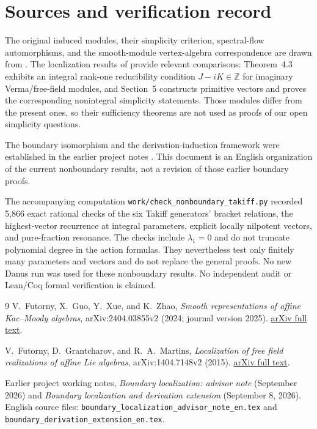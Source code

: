 \documentclass[11pt,a4paper]{article}
\newcommand{\Z}{\mathbb Z}
\theoremstyle{plainupright}
\begin{document}
\clearpage
\section{Sources and verification record}

The original induced modules, their simplicity criterion, spectral-flow
automorphisms, and the smooth-module vertex-algebra correspondence are
drawn from \cite{FGXZ}. The localization results of \cite{FGM} provide
relevant comparisons: Theorem~4.3 exhibits an integral rank-one
reducibility condition \(J-iK\in\Z\) for imaginary Verma/free-field
modules, and Section~5 constructs primitive vectors and proves
the corresponding nonintegral simplicity statements.
Those modules differ from the present ones, so their sufficiency
theorems are not used as proofs of our open simplicity questions.

The boundary isomorphism and the derivation-induction framework were
established in the earlier project notes \cite{Boundary}.
This document is an English organization of the current nonboundary
results, not a revision of those earlier boundary proofs.

The accompanying computation
\texttt{work/check\_nonboundary\_takiff.py} recorded 5,866 exact
rational checks of the six Takiff generators' bracket relations,
the highest-vector recurrence at integral parameters, explicit
locally nilpotent vectors, and pure-fraction resonance.
The checks include \(\lambda_1=0\) and do not truncate polynomial
degree in the action formulas. They nevertheless test only finitely
many parameters and vectors and do not replace the general proofs.
No new Danus run was used for these nonboundary results.
No independent audit or Lean/Coq formal verification is claimed.

\begingroup
\raggedright
\begin{thebibliography}{9}
V.~Futorny, X.~Guo, Y.~Xue, and K.~Zhao,
\emph{Smooth representations of affine Kac--Moody algebras},
arXiv:2404.03855v2 (2024; journal version 2025).
\href{https://arxiv.org/html/2404.03855v2}{arXiv full text}.

V.~Futorny, D.~Grantcharov, and R.~A.~Martins,
\emph{Localization of free field realizations of affine Lie algebras},
arXiv:1404.7148v2 (2015).
\href{https://arxiv.org/html/1404.7148v2}{arXiv full text}.

Earlier project working notes, \emph{Boundary localization: advisor note}
(September 2026) and \emph{Boundary localization and derivation extension}
(September 8, 2026). English source files:
\texttt{boundary\_localization\_advisor\_note\_en.tex} and
\texttt{boundary\_derivation\_extension\_en.tex}.
\end{thebibliography}
\endgroup
\end{document}

